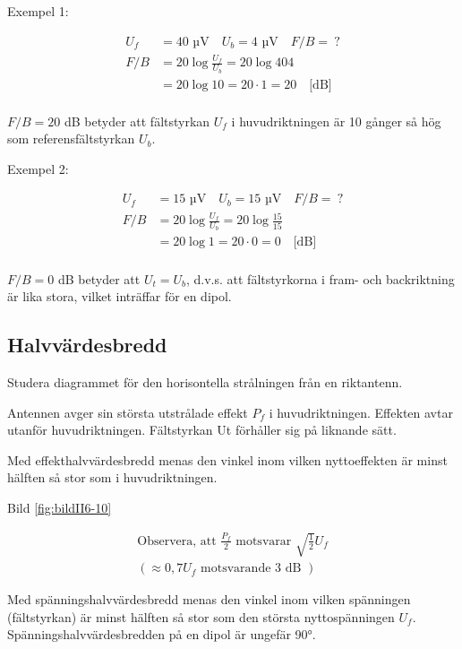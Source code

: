 Exempel 1:

\begin{align*}
  U_f &= 40 \text{ µV} \quad U_b = 4\text{ µV} \quad F/B =\ ? \\
  F/B &= 20 \log\frac{U_f}{U_b} = 20 \log{40}{4} \\
  &= 20 \log 10 = 20 \cdot 1 = 20 \quad \text{[dB]} \\
\end{align*}

\(F/B = 20\) dB betyder att fältstyrkan \(U_f\) i huvudriktningen är
10 gånger så hög som referensfältstyrkan \(U_b\).

Exempel 2:

\begin{align*}
  U_f &= 15 \text{ µV} \quad U_b = 15\text{ µV} \quad F/B =\ ? \\
  F/B &= 20 \log\frac{U_f}{U_b} = 20 \log\frac{15}{15} \\
  &= 20 \log 1 = 20 \cdot 0 = 0 \quad \text{[dB]} \\
\end{align*}

\(F/B = 0\) dB betyder att \(U_t = U_b\), d.v.s. att fältstyrkorna i
fram- och backriktning är lika stora, vilket inträffar för en dipol.

\subsection{Halvvärdesbredd}

Studera diagrammet för den horisontella strålningen från en riktantenn.

Antennen avger sin största utstrålade effekt \(P_f\) i
huvudriktningen. Effekten avtar utanför huvudriktningen. Fältstyrkan
Ut förhåller sig på liknande sätt.

Med effekthalvvärdesbredd menas den vinkel inom vilken nyttoeffekten
är minst hälften så stor som i huvudriktningen.

Bild \ref{fig:bildII6-10}

\begin{gather*}
  \text{Observera, att } \frac{P_f}{2} \text{ motsvarar }
  \sqrt{\frac{1}{2}}U_f \\
  ( \approx 0,7 U_f \text{ motsvarande 3 dB })
\end{gather*}

Med spänningshalvvärdesbredd menas den vinkel inom vilken spänningen
(fältstyrkan) är minst hälften så stor som den största nyttospänningen
\(U_f\). Spänningshalvvärdesbredden på en dipol är ungefär 90°.

